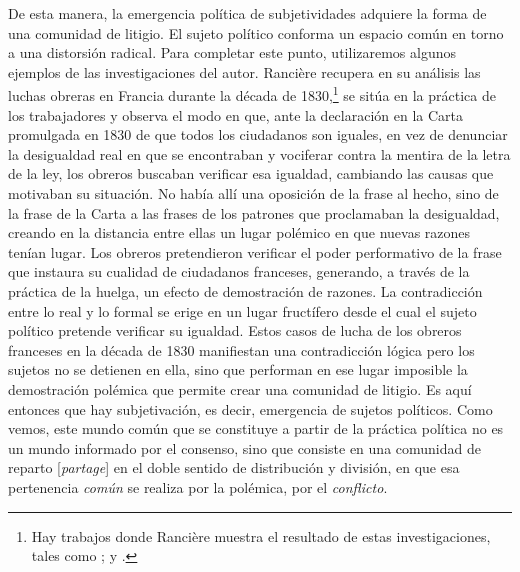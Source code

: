 De esta manera, la emergencia política de subjetividades adquiere la forma de una comunidad de litigio. El sujeto político conforma un espacio común en torno a una distorsión radical. Para completar este punto, utilizaremos algunos ejemplos de las investigaciones del autor. Rancière recupera en su análisis las luchas obreras en Francia durante la década de 1830,\footnote{Hay trabajos donde Rancière muestra el resultado de estas investigaciones, tales como \cite[][]{@7083-RANCIERE1991}; y \cite[][]{@7084-RANCIERE2010}.} se sitúa en la práctica de los trabajadores y observa el modo en que, ante la declaración en la Carta promulgada en 1830 de que todos los ciudadanos son iguales, en vez de denunciar la desigualdad real en que se encontraban y vociferar contra la mentira de la letra de la ley, los obreros buscaban verificar esa igualdad, cambiando las causas que motivaban su situación. No había allí una oposición de la frase al hecho, sino de la frase de la Carta a las frases de los patrones que proclamaban la desigualdad, creando en la distancia entre ellas un lugar polémico en que nuevas razones tenían lugar. Los obreros pretendieron verificar el poder performativo de la frase que instaura su cualidad de ciudadanos franceses, generando, a través de la práctica de la huelga, un efecto de demostración de razones. La contradicción entre lo real y lo formal se erige en un lugar fructífero desde el cual el sujeto político pretende verificar su igualdad. Estos casos de lucha de los obreros franceses en la década de 1830 manifiestan una contradicción lógica pero los sujetos no se detienen en ella, sino que performan en ese lugar imposible la demostración polémica que permite crear una comunidad de litigio. Es aquí entonces que hay subjetivación, es decir, emergencia de sujetos políticos. Como vemos, este mundo común que se constituye a partir de la práctica política no es un mundo informado por el consenso, sino que consiste en una comunidad de reparto {[}\emph{partage}{]} en el doble sentido de distribución y división, en que esa pertenencia \emph{común} se realiza por la polémica, por el \emph{conflicto}.

